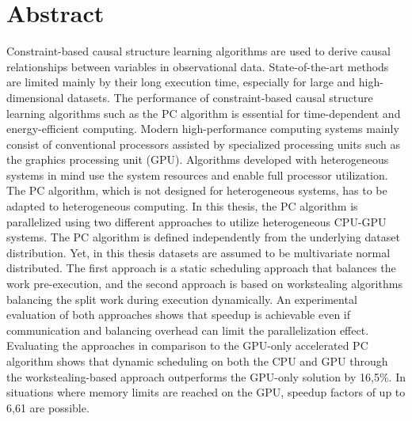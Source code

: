 \chapter*{Abstract}
Constraint-based causal structure learning algorithms are used to derive causal relationships between variables in observational data. State-of-the-art methods are limited mainly by their long execution time, especially for large and high-dimensional datasets. The performance of constraint-based causal structure learning algorithms such as the PC algorithm is essential for time-dependent and energy-efficient computing. Modern high-performance computing systems mainly consist of conventional processors assisted by specialized processing units such as the graphics processing unit (GPU). Algorithms developed with heterogeneous systems in mind use the system resources and enable full processor utilization. The PC algorithm, which is not designed for heterogeneous systems, has to be adapted to heterogeneous computing. In this thesis, the PC algorithm is parallelized using two different approaches to utilize heterogeneous CPU-GPU systems. The PC algorithm is defined independently from the underlying dataset distribution. Yet, in this thesis datasets are assumed to be multivariate normal distributed. The first approach is a static scheduling approach that balances the work pre-execution, and the second approach is based on workstealing algorithms balancing the split work during execution dynamically. An experimental evaluation of both approaches shows that speedup is achievable even if communication and balancing overhead can limit the parallelization effect. Evaluating the approaches in comparison to the GPU-only accelerated PC algorithm shows that dynamic scheduling on both the CPU and GPU through the workstealing-based approach outperforms the GPU-only solution by 16,5\%. In situations where memory limits are reached on the GPU, speedup factors of up to 6,61 are possible.

